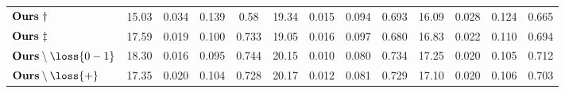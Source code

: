 \begin{table}[t]
{\begin{tabular}{lcccccccccccc}
      \midrule
      $\text{\textbf{Ours}}~\dagger$                & 15.03                             & 0.034                             & 0.139                             & 0.58            & 19.34           & 0.015            & 0.094            & 0.693           & 16.09           & 0.028            & 0.124            & 0.665           \\
      $\text{\textbf{Ours}}~\ddagger$               & 17.59                             & 0.019                             & 0.100                             & 0.733           & 19.05           & 0.016            & 0.097            & 0.680           & 16.83           & 0.022            & 0.110            & 0.694           \\
      $\text{\textbf{Ours}}\setminus\loss{0-1}$     & 18.30                             & 0.016                             & 0.095                             & 0.744           & 20.15           & 0.010            & 0.080            & 0.734           & 17.25           & 0.020            & 0.105            & 0.712           \\
      $\text{\textbf{Ours}}\setminus\loss{+}$       & 17.35                             & 0.020                             & 0.104                             & 0.728           & 20.17           & 0.012            & 0.081            & 0.729           & 17.10           & 0.020            & 0.106            & 0.703           \\

      \bottomrule
    \end{tabular}
  }
  \label{tab:lumigauss-results_osr_eval}
\end{table}

